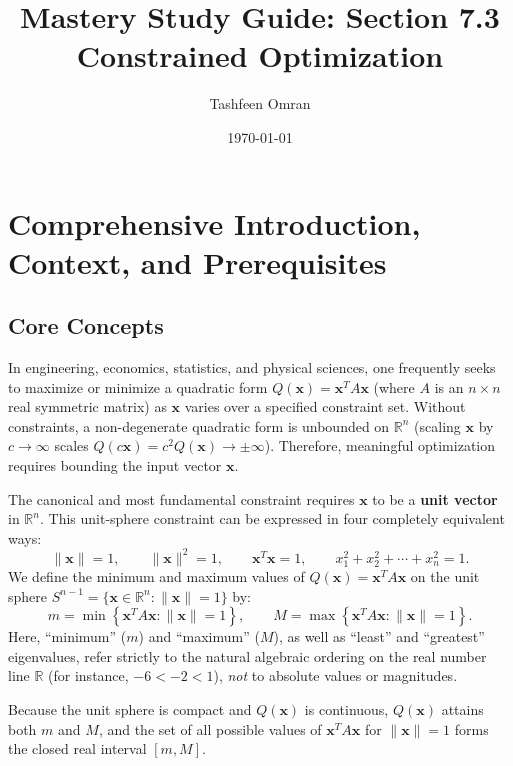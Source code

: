 \documentclass[11pt, letterpaper]{article}
\title{\textbf{Mastery Study Guide: Section 7.3 Constrained Optimization}}
\author{Tashfeen Omran}
\date{\today}
\theoremstyle{definition}
\theoremstyle{remark}
\begin{document}
\maketitle
\tableofcontents
\newpage

\section{Comprehensive Introduction, Context, and Prerequisites}

\subsection{Core Concepts}
In engineering, economics, statistics, and physical sciences, one frequently seeks to maximize or minimize a quadratic form $Q(\mathbf{x}) = \mathbf{x}^T A \mathbf{x}$ (where $A$ is an $n \times n$ real symmetric matrix) as $\mathbf{x}$ varies over a specified constraint set. Without constraints, a non-degenerate quadratic form is unbounded on $\mathbb{R}^n$ (scaling $\mathbf{x}$ by $c \to \infty$ scales $Q(c\mathbf{x}) = c^2 Q(\mathbf{x}) \to \pm \infty$). Therefore, meaningful optimization requires bounding the input vector $\mathbf{x}$.

The canonical and most fundamental constraint requires $\mathbf{x}$ to be a \textbf{unit vector} in $\mathbb{R}^n$. This unit-sphere constraint can be expressed in four completely equivalent ways:
\[
\|\mathbf{x}\| = 1, \qquad \|\mathbf{x}\|^2 = 1, \qquad \mathbf{x}^T \mathbf{x} = 1, \qquad x_1^2 + x_2^2 + \cdots + x_n^2 = 1.
\]
We define the minimum and maximum values of $Q(\mathbf{x}) = \mathbf{x}^T A \mathbf{x}$ on the unit sphere $S^{n-1} = \{\mathbf{x} \in \mathbb{R}^n : \|\mathbf{x}\| = 1\}$ by:
\[
m = \min \left\{ \mathbf{x}^T A \mathbf{x} : \|\mathbf{x}\| = 1 \right\}, \qquad M = \max \left\{ \mathbf{x}^T A \mathbf{x} : \|\mathbf{x}\| = 1 \right\}.
\]
Here, ``minimum'' ($m$) and ``maximum'' ($M$), as well as ``least'' and ``greatest'' eigenvalues, refer strictly to the natural algebraic ordering on the real number line $\mathbb{R}$ (for instance, $-6 < -2 < 1$), \emph{not} to absolute values or magnitudes.

Because the unit sphere is compact and $Q(\mathbf{x})$ is continuous, $Q(\mathbf{x})$ attains both $m$ and $M$, and the set of all possible values of $\mathbf{x}^T A \mathbf{x}$ for $\|\mathbf{x}\| = 1$ forms the closed real interval $[m, M]$.
\end{document}

